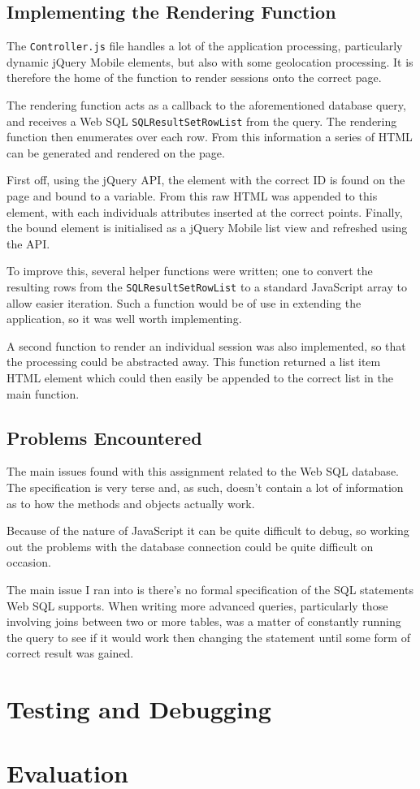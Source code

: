 \documentclass[10pt, a4paper]{article}
\begin{document}
\subsection{Implementing the Rendering Function}
The \texttt{Controller.js} file handles a lot of the application processing,
particularly dynamic jQuery Mobile elements, but also with some geolocation
processing. It is therefore the home of the function to render sessions onto
the correct page.

The rendering function acts as a callback to the aforementioned database query,
and receives a Web SQL \texttt{SQLResultSetRowList} from the query. The 
rendering function then enumerates over each row. From this information a 
series of HTML can be generated and rendered on the page.

First off, using the jQuery API, the element with the correct ID is found on 
the page and bound to a variable. From this raw HTML was appended to this
element, with each individuals attributes inserted at the correct points.
Finally, the bound element is initialised as a jQuery Mobile list view and
refreshed using the API.

To improve this, several helper functions were written; one to convert the
resulting rows from the \texttt{SQLResultSetRowList} to a standard JavaScript
array to allow easier iteration. Such a function would be of use in extending
the application, so it was well worth implementing.

A second function to render an individual session was also implemented, so that
the processing could be abstracted away. This function returned a list item 
HTML element which could then easily be appended to the correct list in the
main function.

\subsection{Problems Encountered}
The main issues found with this assignment related to the Web SQL database. The
specification is very terse and, as such, doesn't contain a lot of information
as to how the methods and objects actually work.

Because of the nature of JavaScript it can be quite difficult to debug, so
working out the problems with the database connection could be quite difficult
on occasion.

The main issue I ran into is there's no formal specification of the SQL
statements Web SQL supports. When writing more advanced queries, particularly
those involving joins between two or more tables, was a matter of constantly
running the query to see if it would work then changing the statement until
some form of correct result was gained.


\section{Testing and Debugging}


\section{Evaluation}


\newpage


\end{document}

